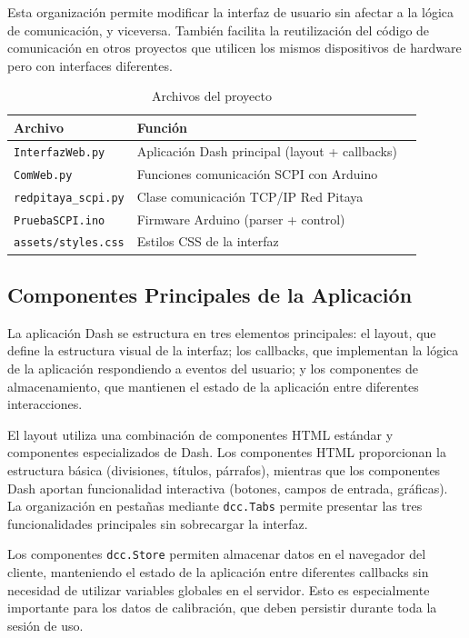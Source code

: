 \documentclass[12pt,a4paper]{article}
\begin{document}
Esta organización permite modificar la interfaz de usuario sin afectar a la lógica de comunicación, y viceversa. También facilita la reutilización del código de comunicación en otros proyectos que utilicen los mismos dispositivos de hardware pero con interfaces diferentes.

\begin{table}[H]
\centering
\caption{Archivos del proyecto}
\begin{tabular}{@{}llp{6cm}@{}}
\toprule
\textbf{Archivo} & \textbf{Función} \\
\midrule
\texttt{InterfazWeb.py} & Aplicación Dash principal (layout + callbacks) \\
\texttt{ComWeb.py} & Funciones comunicación SCPI con Arduino \\
\texttt{redpitaya\_scpi.py} & Clase comunicación TCP/IP Red Pitaya \\
\texttt{PruebaSCPI.ino} & Firmware Arduino (parser + control) \\
\texttt{assets/styles.css} & Estilos CSS de la interfaz \\
\bottomrule
\end{tabular}
\end{table}

\subsection{Componentes Principales de la Aplicación}

La aplicación Dash se estructura en tres elementos principales: el layout, que define la estructura visual de la interfaz; los callbacks, que implementan la lógica de la aplicación respondiendo a eventos del usuario; y los componentes de almacenamiento, que mantienen el estado de la aplicación entre diferentes interacciones.

El layout utiliza una combinación de componentes HTML estándar y componentes especializados de Dash. Los componentes HTML proporcionan la estructura básica (divisiones, títulos, párrafos), mientras que los componentes Dash aportan funcionalidad interactiva (botones, campos de entrada, gráficas). La organización en pestañas mediante \texttt{dcc.Tabs} permite presentar las tres funcionalidades principales sin sobrecargar la interfaz.

Los componentes \texttt{dcc.Store} permiten almacenar datos en el navegador del cliente, manteniendo el estado de la aplicación entre diferentes callbacks sin necesidad de utilizar variables globales en el servidor. Esto es especialmente importante para los datos de calibración, que deben persistir durante toda la sesión de uso.
\end{document}

